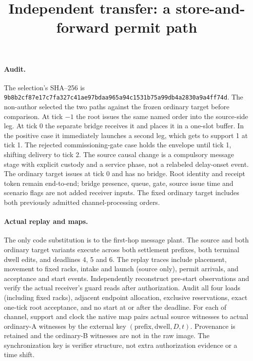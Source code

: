 \documentclass{article}
\title{Independent transfer: a store-and-forward permit path}
\date{}
\begin{document}
\maketitle

\paragraph{Audit.} The selection's SHA--256 is
\texttt{9b8b2cf87e17c7fa327c41ae97bdaa965a94c1531b75a99db4a2830a9a4ff74d}.
The non-author selected the two paths against the frozen ordinary target before comparison. At tick $-1$ the root issues the same named order into the source-side leg. At tick 0 the separate bridge receives it and places it in a one-slot buffer. In the positive case it immediately launches a second leg, which gets to support 1 at tick 1. The rejected commissioning-gate case holds the envelope until tick 1, shifting delivery to tick 2. The source causal change is a compulsory message stage with explicit custody and a service phase, not a relabeled delay-onset event. The ordinary target issues at tick 0 and has no bridge. Root identity and receipt token remain end-to-end; bridge presence, queue, gate, source issue time and scenario flags are not added receiver inputs. The fixed ordinary target includes both previously admitted channel-processing orders.

\paragraph{Actual replay and maps.} The only code substitution is to the first-hop message plant. The source and both ordinary target variants execute across both settlement prefixes, both terminal dwell edits, and deadlines 4, 5 and 6. The replay traces include placement, movement to fixed racks, intake and launch (source only), permit arrivals, and acceptance and start events. Independently reconstruct pre-start observations and verify the actual receiver's guard reads after authorization. Audit all four loads (including fixed racks), adjacent endpoint allocation, exclusive reservations, exact one-tick root acceptance, and no start at or after the deadline. For each of channel, support and clock the native map pairs actual source witnesses to actual ordinary-A witnesses by the external key $(\mathrm{prefix},\mathrm{dwell},D,t)$. Provenance is retained and the ordinary-B witnesses are not in the raw image. The synchronization key is verifier structure, not extra authorization evidence or a time shift.
\end{document}
